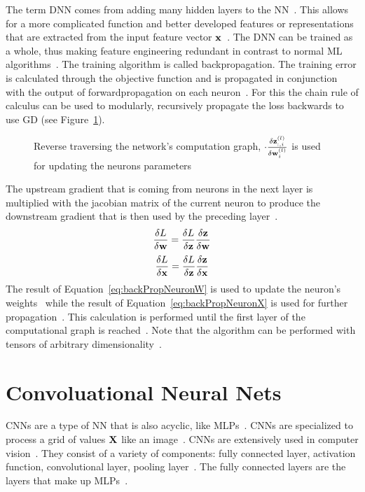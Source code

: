 The term \ac{DNN} comes from adding many hidden layers to the \ac{NN}~\citep{shrestha_review_2019}.
This allows for a more complicated function and better developed features or representations that
are extracted from the input feature vector $\textbf{x}$~\citep{oyedotun_deep_2015}.
The \ac{DNN} can be trained as a whole, thus making feature engineering redundant in contrast to
normal \ac{ML} algorithms~\citep{arpteg_software_2018}.
The training algorithm is called backpropagation.
The training error is calculated through the objective function and is propagated
in conjunction with the output of forwardpropagation on each neuron~\citep{goodfellow_deep_2016}.
For this the chain rule of calculus can be used to modularly, recursively propagate the
loss backwards to use \ac{GD} (see Figure~\ref{fig:error-backpropagation}).
\begin{figure}[ht]
	\centering
    
	\caption[Backpropagation of errors through the network.]{%
        Reverse traversing the network's computation graph,
        $\cdot \frac{\delta \textbf{z}_{:,i}^{(l)}}{\delta \textbf{w}_i^{(l)}}$ is used for
        updating the neurons parameters\label{fig:error-backpropagation}
    }
\end{figure}
The upstream gradient that is coming from neurons in the next layer is multiplied with the
jacobian matrix of the current neuron to produce the downstream gradient that is then used by
the preceding layer~\citep{boue_deep_2018,goodfellow_deep_2016}.
\begin{equation}\label{eq:backPropNeuronW}
    \frac{\delta L}{\delta\textbf{w}} = \frac{\delta L}{\delta\textbf{z}} \frac{\delta\textbf{z}}{\delta\textbf{w}}
\end{equation}
\begin{equation}\label{eq:backPropNeuronX}
    \frac{\delta L}{\delta\textbf{x}} = \frac{\delta L}{\delta\textbf{z}}\frac{\delta\textbf{z}}{\delta\textbf{x}}
\end{equation}
The result of Equation~\ref{eq:backPropNeuronW} is used to update the neuron's weights \w\ while
the result of Equation~\ref{eq:backPropNeuronX} is used for further propagation~\citep{boue_deep_2018}.
This calculation is performed until the first layer of the computational graph is
reached~\citep{goodfellow_deep_2016}.
Note that the algorithm can be performed with tensors of arbitrary
dimensionality~\citep{goodfellow_deep_2016}.

\section{Convoluational Neural Nets}
\acp{CNN} are a type of \ac{NN} that is also acyclic, like \acp{MLP}~\citep{chauhan_review_2018}.
\acp{CNN} are specialized to process a grid of values $\textbf{X}$ like an image~\citep{goodfellow_deep_2016}.
\acp{CNN} are extensively used in computer vision~\citep{chauhan_review_2018}.
They consist of a variety of components: fully connected layer, activation function,
convolutional layer, pooling layer~\citep{chauhan_review_2018,ponti_everything_2017}.
The fully connected layers are the layers that make up \acp{MLP}~\citep{ponti_everything_2017}.

